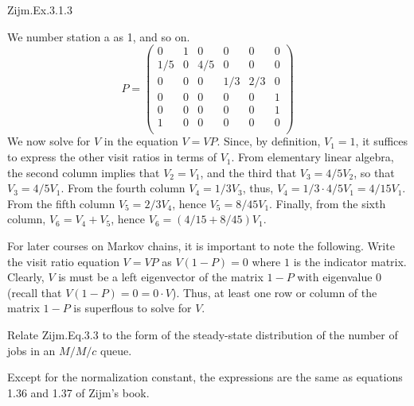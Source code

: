 \begin{exercise}
Zijm.Ex.3.1.3
\begin{solution}
We number  station a as 1, and so on.
\begin{equation*}
  P = 
  \begin{pmatrix}
     0 & 1 & 0 & 0 & 0 &0 \\
     1/5 & 0 & 4/5 & 0 & 0 & 0\\
     0& 0 & 0 & 1/3 & 2/3 & 0 \\
     0 & 0 & 0 & 0 & 0 & 1\\
     0 & 0 & 0 & 0 & 0 & 1\\
     1 & 0 & 0 & 0 & 0 & 0\\
  \end{pmatrix}
\end{equation*}
We now solve for $V$ in the equation $V = VP$. Since, by
definition, $V_1=1$, it suffices to express the other visit ratios in
terms of $V_1$. From elementary linear algebra, the second column
implies that $V_2 = V_1$, and the third that $V_3 = 4/5 V_2$, so that
$V_3 = 4/5 V_1$. From the fourth column $V_4 = 1/3 V_3$, thus,
$V_4 = 1/3 \cdot 4/5 V_1 = 4/15 V_1$.  From the fifth column
$V_5 = 2/3 V_4$, hence $V_5 = 8/45 V_1$. Finally, from the sixth
column, $V_6 = V_4+V_5$, hence $V_6 = (4/15 + 8/45)V_1$.

For later courses on Markov chains, it is important to note the
following. Write the visit ratio equation $V = VP$ as $V(1-P)=0$ where
$1$ is the indicator matrix. Clearly, $V$ is must be a left
eigenvector of the matrix $1-P$ with eigenvalue 0 (recall that
$V(1-P) = 0 = 0\cdot V$). Thus, at least one row or column of the matrix $1-P$ is superflous to solve for $V$. 
\end{solution}
\end{exercise}

\begin{exercise}
  Relate Zijm.Eq.3.3 to the form of the steady-state distribution of
  the number of jobs in an $M/M/c$ queue.
  \begin{solution}
    Except for the normalization constant, the expressions are the
    same as equations 1.36 and 1.37 of Zijm's book.
  \end{solution}
\end{exercise}

